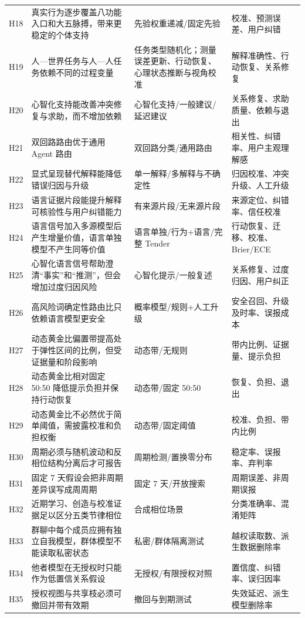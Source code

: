 \documentclass[UTF8,a4paper,11pt]{ctexart}
\begin{document}
\begin{center}
\begin{longtable}{@{}p{1.4cm}p{4.5cm}p{5.2cm}p{3.4cm}@{}}
H18 & 真实行为逐步覆盖八功能入口和大五脉搏，带来更稳定的个体支持 & 先验权重递减/固定先验 & 校准、预测误差、用户纠错 \\
H19 & 人—世界任务与人—人任务依赖不同的过程变量 & 任务类型随机化；测量误差更新、行动恢复、心理状态推断与视角校准 & 解释准确性、行动恢复、关系修复 \\
H20 & 心智化支持能改善冲突修复与求助，而不增加依赖 & 心智化支持/一般建议/延迟建议 & 关系修复、求助质量、依赖与退出 \\
H21 & 双回路路由优于通用 Agent 路由 & 双回路分类/通用路由 & 相关性、纠错率、用户主观理解感 \\
H22 & 显式呈现替代解释能降低错误归因与升级 & 单一解释/多解释与不确定性 & 归因校准、冲突升级、人工升级 \\
H23 & 语言证据片段能提升解释可核验性与用户纠错能力 & 有来源片段/无来源片段 & 来源定位、纠错率、信任校准 \\
H24 & 语言信号加入多源模型后产生增量价值，语言单独模型不产生同等价值 & 语言单独/行为+语言/完整 Tender & 行动恢复、迁移、校准、Brier/ECE \\
H25 & 心智化语言信号帮助澄清“事实”和“推测”，但会增加过度归因风险 & 心智化提示/一般复述 & 关系修复、过度归因、用户纠正 \\
H26 & 高风险词确定性路由比只依赖语言模型更安全 & 概率模型/规则+人工升级 & 安全召回、升级及时率、误报成本 \\
H27 & 动态黄金比偏置带提高处于弹性区间的比例，但受证据量和阶段影响 & 动态带/无规则 & 带内比例、证据量、提示负担 \\
H28 & 动态黄金比相对固定 50:50 降低提示负担并保持行动恢复 & 动态带/固定 50:50 & 恢复、负担、退出 \\
H29 & 动态黄金比不必然优于简单阈值，需披露校准和负担权衡 & 动态带/固定阈值 & 校准、负担、带内比例 \\
H30 & 周期必须与随机波动和反相位结构分离后才可报告 & 周期检测/置换零分布 & 稳定率、误报率、弃判率 \\
H31 & 固定 7 天假设会把非周期差异误写成周周期 & 固定 7 天/开放搜索 & 周期误差、非周期误报 \\
H32 & 近期学习、创造与校准证据足以区分五类节律相位 & 合成相位场景 & 分类准确率、混淆矩阵 \\
H33 & 群聊中每个成员应拥有独立自我模型，群体模型不能读取私密状态 & 私密/群体隔离测试 & 越权读取数、派生数据删除率 \\
H34 & 他者模型在无授权时只能作为低置信关系假设 & 无授权/有限授权对照 & 置信度、纠错率、误归因率 \\
H35 & 授权视图与共享枝必须可撤回并带有效期 & 撤回与到期测试 & 失效延迟、派生模型删除率 \\

\end{longtable}
\end{center}
\end{document}
